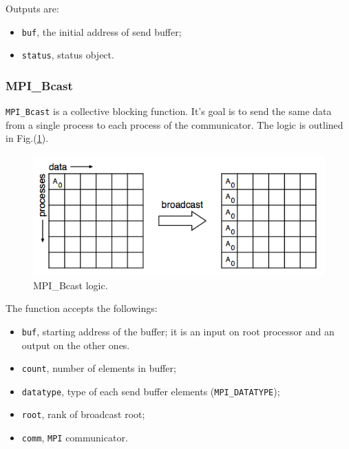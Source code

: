 Outputs are:

\begin{itemize}
\item \verb|buf|, the initial address of send buffer;
\item \verb|status|, status object.
\end{itemize}

\subsubsection{MPI\_Bcast}\label{subsubsection:bcast}
\verb|MPI_Bcast| is a collective blocking function. It's goal is to send the same data from a single process to each process of the communicator. The logic is outlined in Fig.(\ref{fig:bcast}).

\begin{figure}
\centering
\includegraphics[scale=.45]{images/broadcast.png}
\caption{MPI\_Bcast logic.}
\label{fig:bcast}
\end{figure}

The function accepts the followings:

\begin{itemize}
\item \verb|buf|, starting address of the buffer; it is an input on root processor and an output on the other ones.
\item \verb|count|, number of elements in buffer;
\item \verb|datatype|, type of each send buffer elements (\verb|MPI_DATATYPE|);
\item \verb|root|, rank of broadcast root;
\item \verb|comm|, \verb|MPI| communicator.
\end{itemize}

